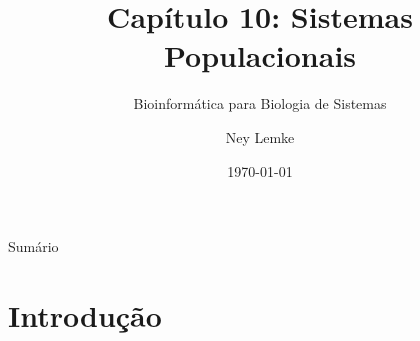 


\title[Cap. 10: Sistemas Populacionais]{Capítulo 10: Sistemas Populacionais}
\subtitle{Bioinformática para Biologia de Sistemas}
\author{Ney Lemke}
\date{\today}



\begin{frame}
\titlepage
\end{frame}

\begin{frame}{Sumário}
\tableofcontents
\end{frame}

\section{Introdução}

